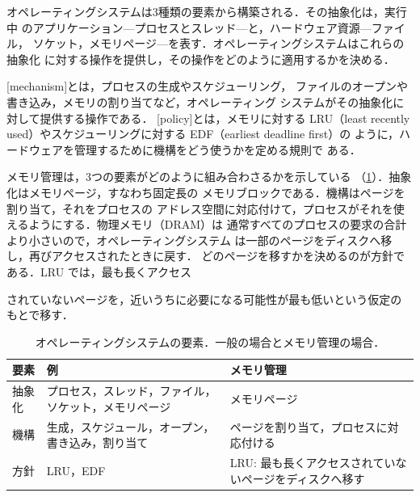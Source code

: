\documentclass[../main.tex]{subfiles}
\begin{document}
オペレーティングシステムは3種類の要素から構築される．その抽象化は，実行中
のアプリケーション---プロセスとスレッド---と，ハードウェア資源---ファイル，
ソケット，メモリページ---を表す．オペレーティングシステムはこれらの抽象化
に対する操作を提供し，その操作をどのように適用するかを決める．

\begin{definition}[機構と方針]
  [mechanism]とは，プロセスの生成やスケジューリング，
  ファイルのオープンや書き込み，メモリの割り当てなど，オペレーティング
  システムがその抽象化に対して提供する操作である．
  [policy]とは，メモリに対する LRU（least recently
  used）やスケジューリングに対する EDF（earliest deadline first）の
  ように，ハードウェアを管理するために機構をどう使うかを定める規則で
  ある．
\end{definition}

メモリ管理は，3つの要素がどのように組み合わさるかを示している
（\cref{tab:l01-elements}）．抽象化はメモリページ，すなわち固定長の
メモリブロックである．機構はページを割り当て，それをプロセスの
アドレス空間に対応付けて，プロセスがそれを使えるようにする．物理メモリ（DRAM）は
通常すべてのプロセスの要求の合計より小さいので，オペレーティングシステム
は一部のページをディスクへ移し，再びアクセスされたときに戻す．
どのページを移すかを決めるのが方針である．LRU では，最も長くアクセス

されていないページを，近いうちに必要になる可能性が最も低いという仮定の
もとで移す．

\begin{table}[htbp]

  \centering
  \caption{オペレーティングシステムの要素．一般の場合とメモリ管理の場合．}
  \label{tab:l01-elements}
  \small
  \begin{tabular}{@{}l>{\raggedright}p{47mm}>{\raggedright\arraybackslash}p{45mm}@{}}
    \toprule
    要素 & 例 & メモリ管理 \\
    \midrule
    抽象化 & プロセス，スレッド，ファイル，ソケット，メモリページ & メモリページ \\
    機構 & 生成，スケジュール，オープン，書き込み，割り当て
      & ページを割り当て，プロセスに対応付ける \\
    方針 & LRU，EDF & LRU: 最も長くアクセスされていないページをディスクへ移す \\
    \bottomrule
  \end{tabular}
\end{table}
\end{document}
